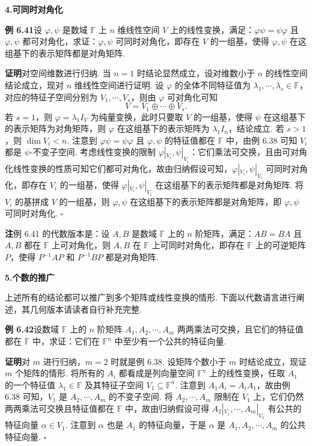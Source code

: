 \documentclass[UTF8, 12pt, fontset=fandol, oneside]{ctexart}
\begin{document}
\noindent\textbf{4.\quad 可同时对角化}

\noindent\textbf{例 6.41}\quad 设 $\varphi,\psi$ 是数域 $\mathbb{F}$ 上 $n$ 维线性空间 $V$ 上的线性变换，满足：$\varphi\psi=\psi\varphi$ 且 $\varphi,\psi$ 都可对角化，求证：$\varphi,\psi$ 可同时对角化，即存在 $V$ 的一组基，使得 $\varphi,\psi$ 在这组基下的表示矩阵都是对角矩阵.

\noindent\textbf{证明}\quad 对空间维数进行归纳. 当 $n=1$ 时结论显然成立，设对维数小于 $n$ 的线性空间结论成立，现对 $n$ 维线性空间进行证明. 设 $\varphi$ 的全体不同特征值为 $\lambda_1,\cdots,\lambda_s\in\mathbb{F}$，对应的特征子空间分别为 $V_1,\cdots,V_s$，则由 $\varphi$ 可对角化可知
\[
V=V_1\oplus\cdots\oplus V_s.
\]
若 $s=1$，则 $\varphi=\lambda_1I_V$ 为纯量变换，此时只要取 $V$ 的一组基，使得 $\psi$ 在这组基下的表示矩阵为对角矩阵，则 $\varphi$ 在这组基下的表示矩阵为 $\lambda_1I_n$，结论成立. 若 $s>1$，则 $\dim V_i<n$. 注意到 $\varphi\psi=\psi\varphi$ 且 $\varphi,\psi$ 的特征值都在 $\mathbb{F}$ 中，由例 6.38 可知 $V_i$ 都是 $\psi$-不变子空间. 考虑线性变换的限制 $\varphi|_{V_i},\psi|_{V_i}$：它们乘法可交换，且由可对角化线性变换的性质可知它们都可对角化，故由归纳假设可知，$\varphi|_{V_i},\psi|_{V_i}$ 可同时对角化，即存在 $V_i$ 的一组基，使得 $\varphi|_{V_i},\psi|_{V_i}$ 在这组基下的表示矩阵都是对角矩阵. 将 $V_i$ 的基拼成 $V$ 的一组基，则 $\varphi,\psi$ 在这组基下的表示矩阵都是对角矩阵，即 $\varphi,\psi$ 可同时对角化. $\square$

\noindent\textbf{注}\quad 例 6.41 的代数版本是：设 $A,B$ 是数域 $\mathbb{F}$ 上的 $n$ 阶矩阵，满足：$AB=BA$ 且 $A,B$ 都在 $\mathbb{F}$ 上可对角化，则 $A,B$ 在 $\mathbb{F}$ 上可同时对角化，即存在 $\mathbb{F}$ 上的可逆矩阵 $P$，使得 $P^{-1}AP$ 和 $P^{-1}BP$ 都是对角矩阵.

\noindent\textbf{5.\quad 个数的推广}

上述所有的结论都可以推广到多个矩阵或线性变换的情形. 下面以代数语言进行阐述，其几何版本请读者自行补充完整.

\noindent\textbf{例 6.42}\quad 设数域 $\mathbb{F}$ 上的 $n$ 阶矩阵 $A_1,A_2,\cdots,A_m$ 两两乘法可交换，且它们的特征值都在 $\mathbb{F}$ 中，求证：它们在 $\mathbb{F}^n$ 中至少有一个公共的特征向量.

\noindent\textbf{证明}\quad 对 $m$ 进行归纳，$m=2$ 时就是例 6.38. 设矩阵个数小于 $m$ 时结论成立，现证 $m$ 个矩阵的情形. 将所有的 $A_i$ 都看成是列向量空间 $\mathbb{F}^n$ 上的线性变换，任取 $A_1$ 的一个特征值 $\lambda_1\in\mathbb{F}$ 及其特征子空间 $V_1\subseteq\mathbb{F}^n$. 注意到 $A_1A_i=A_iA_1$，故由例 6.38 可知，$V_1$ 是 $A_2,\cdots,A_m$ 的不变子空间. 将 $A_2,\cdots,A_m$ 限制在 $V_1$ 上，它们仍然两两乘法可交换且特征值都在 $\mathbb{F}$ 中，故由归纳假设可得 $A_2|_{V_1},\cdots,A_m|_{V_1}$ 有公共的特征向量 $\alpha\in V_1$. 注意到 $\alpha$ 也是 $A_1$ 的特征向量，于是 $\alpha$ 是 $A_1,A_2,\cdots,A_m$ 的公共特征向量. $\square$
\end{document}
